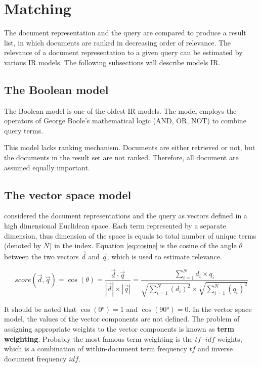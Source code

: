 \section{Matching}
The document representation and the query are compared to produce a result list, in which documents are ranked in decreasing order of relevance.
The relevance of a document representation to a given query can be estimated by various IR models.
The following subsections will describe models IR.

\subsection{The Boolean model}

The Boolean model is one of the oldest IR models. The model employs the operators of George Boole's mathematical logic (AND, OR, NOT) to combine query terms.

This model lacks ranking mechanism. Documents are either retrieved or not, but the documents in the result set are not ranked.
Therefore, all document are assumed equally important.

\subsection{The vector space model}

\citet*{vectorSpace} considered the document representations and the query as vectors defined in a high dimensional Euclidean space.
Each term represented by a separate dimension, thus dimension of the space is equals to total number of unique terms (denoted by $N$) in the index.
Equation \ref{eq:cosine} is the cosine of the angle $\theta$ between the two vectors $\overrightarrow{d}$ and $\overrightarrow{q}$, which is used to estimate relevance.

\begin{equation} \label{eq:cosine}
score(\overrightarrow{d}, \overrightarrow{q}) = \cos(\theta)
= \frac{\overrightarrow{d} \cdotp  \overrightarrow{q}}{|\overrightarrow{d}| \times  |\overrightarrow{q}|}
= \frac{\sum_{i=1}^{N} d_i \times q_i}{ \sqrt{\sum_{i=1}^{N} (d_i)^2} \times \sqrt{\sum_{i=1}^{N} (q_i)^2}}
\end{equation}

It should be noted that $\cos(0\si{\degree}) = 1$ and $\cos(90\si{\degree}) = 0$.
In the vector space model, the values of the vector components are not defined.
The problem of assigning appropriate weights to the vector components is known as \textbf{term weighting}.
Probably the most famous term weighting is the $tf\cdot idf$ weights, which is a combination of within-document term frequency $tf$ and inverse document frequency $idf$.


